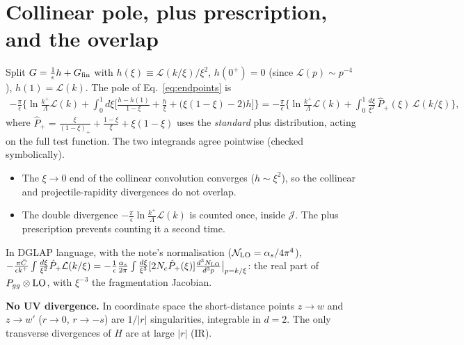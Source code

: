 \documentclass[10pt]{article}
\newcommand{\Lc}{\mathcal L}
\newcommand{\Jc}{\mathcal J}
\newcommand{\Nn}{\mathcal N}
\newcommand{\Ph}{\hat P}
\begin{document}
\section{Collinear pole, plus prescription, and the overlap}
Split $G=\frac{1}{\epsilon}h+G_{\rm fin}$ with
$h(\xi)\equiv\Lc(k/\xi)/\xi^{2}$, $h(0^{+})=0$ (since $\Lc(p)\sim p^{-4}$), $h(1)=\Lc(k)$. The
pole of Eq.~\eqref{eq:endpoints} is
\begin{align}
-\frac{\pi}{\epsilon}\Big\{\ln\frac{k^{+}}{\Lambda}\Lc(k)+\int_{0}^{1}\!d\xi\Big[\frac{h-h(1)}{1-\xi}+\frac{h}{\xi}+\big(\xi(1-\xi)-2\big)h\Big]\Big\}
=-\frac{\pi}{\epsilon}\Big\{\ln\frac{k^{+}}{\Lambda}\Lc(k)+\int_{0}^{1}\!\frac{d\xi}{\xi^{2}}\,\Ph_{+}(\xi)\,\Lc(k/\xi)\Big\},
\end{align}
where $\Ph_{+}=\frac{\xi}{(1-\xi)_{+}}+\frac{1-\xi}{\xi}+\xi(1-\xi)$ uses the \emph{standard}
plus distribution, acting on the full test function. The two integrands agree pointwise
(checked symbolically).
\begin{itemize}
\item The $\xi\to0$ end of the collinear convolution converges ($h\sim\xi^{2}$), so the
collinear and projectile-rapidity divergences do not overlap.
\item The double divergence $-\frac\pi\epsilon\ln\frac{k^{+}}{\Lambda}\Lc(k)$ is counted once,
inside $\Jc$. The plus prescription prevents counting it a second time.
\end{itemize}
In DGLAP language, with the note's normalisation ($\Nn_{\rm LO}=\alpha_s/4\pi^{4}$),
$-\frac{\pi\bar C}{\epsilon k^{+}}\int\frac{d\xi}{\xi^{2}}\Ph_{+}\Lc(k/\xi)
=-\frac{1}{\epsilon}\frac{\alpha_s}{2\pi}\int\frac{d\xi}{\xi^{3}}[2N_c\Ph_{+}(\xi)]\frac{d^{3}N_{\rm LO}}{d^{3}p}\big|_{p=k/\xi}$:
the real part of $P_{gg}\otimes{\rm LO}$, with $\xi^{-3}$ the fragmentation Jacobian.

\textbf{No UV divergence.} In coordinate space the short-distance points $z\to w$ and
$z\to w'$ ($r\to0$, $r\to-s$) are $1/|r|$ singularities, integrable in $d=2$. The only
transverse divergences of $H$ are at large $|r|$ (IR).
\end{document}
